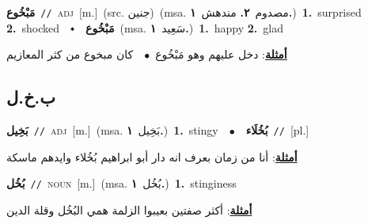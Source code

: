 \documentclass[10pt,a4paper,twoside]{article} %
\begin{document}
\begin{multicols}{2}
{\setlength\topsep{0pt}\textbf{\foreignlanguage{arabic}{مَبْخُوع}}\ {\color{gray}\texttt{//}\color{black}}\ \textsc{adj}\ [m.]\ (src. \color{gray}\foreignlanguage{arabic}{جنين}\color{black})\ \color{gray}(msa. \foreignlanguage{arabic}{مصدوم}~\foreignlanguage{arabic}{\textbf{٢.}}  \foreignlanguage{arabic}{مندهش}~\foreignlanguage{arabic}{\textbf{١.}})\color{black}\ \textbf{1.}~surprised  \textbf{2.}~shocked\ \ $\smblkdiamond$\ \ \setlength\topsep{0pt}\textbf{\foreignlanguage{arabic}{مَبْخُوع}}\ \color{gray}(msa. \foreignlanguage{arabic}{سَعِيد}~\foreignlanguage{arabic}{\textbf{١.}})\color{black}\ \textbf{1.}~happy  \textbf{2.}~glad\  \begin{flushright}\color{gray}\foreignlanguage{arabic}{\textbf{\underline{\foreignlanguage{arabic}{أمثلة}}}: دخل عليهم وهو مَبْخُوع\ $\bullet$\ \  كان مبخوع من كثر المعازيم}\end{flushright}\color{black}} \vspace{2mm}

\vspace{-3mm}
\subsection*{\color{blue}\foreignlanguage{arabic}{ب.خ.ل}\color{blue}{}} 

{\setlength\topsep{0pt}\textbf{\foreignlanguage{arabic}{بَخِيل}}\ {\color{gray}\texttt{//}\color{black}}\ \textsc{adj}\ [m.]\ \color{gray}(msa. \foreignlanguage{arabic}{بَخِيل}~\foreignlanguage{arabic}{\textbf{١.}})\color{black}\ \textbf{1.}~stingy\ \ $\bullet$\ \ \setlength\topsep{0pt}\textbf{\foreignlanguage{arabic}{بُخُلَاء}}\ {\color{gray}\texttt{//}\color{black}}\ [pl.]\  \begin{flushright}\color{gray}\foreignlanguage{arabic}{\textbf{\underline{\foreignlanguage{arabic}{أمثلة}}}: أنا من زمان بعرف انه دار أبو ابراهيم بُخُلاء وايدهم ماسكة}\end{flushright}\color{black}} \vspace{2mm}

{\setlength\topsep{0pt}\textbf{\foreignlanguage{arabic}{بُخُل}}\ {\color{gray}\texttt{//}\color{black}}\ \textsc{noun}\ [m.]\ \color{gray}(msa. \foreignlanguage{arabic}{بُخُل}~\foreignlanguage{arabic}{\textbf{١.}})\color{black}\ \textbf{1.}~stinginess\  \begin{flushright}\color{gray}\foreignlanguage{arabic}{\textbf{\underline{\foreignlanguage{arabic}{أمثلة}}}: أكثر صفتين بعيبوا الزلمة همي البُخُل وقلة الدين}\end{flushright}\color{black}} \vspace{2mm}


\end{multicols}
\end{document}
